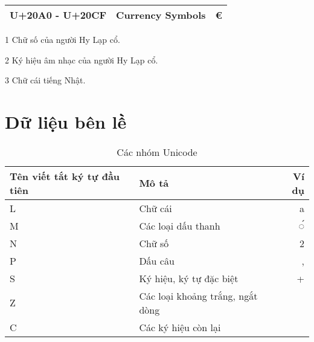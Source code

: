 \begin{table}
\begin{threeparttable}
\begin{tabular}{llr}
            U+20A0 - U+20CF   & Currency Symbols                        & €              \\
            \bottomrule
        \end{tabular}
        \begin{tablenotes}
            \item [1] Chữ số của người Hy Lạp cổ.
            \item [2] Ký hiệu âm nhạc của người Hy Lạp cổ.
            \item [3] Chữ cái tiếng Nhật.
        \end{tablenotes}
    \end{threeparttable}
\end{table}

\section*{Dữ liệu bên lề}
\begin{table}
    \centering
    \caption{Các nhóm Unicode}
    \label{table:unicode-categories}
    \begin{tabular}{llr}
        \toprule
        \textbf{Tên viết tắt ký tự đầu tiên} & \textbf{Mô tả}                   & \textbf{Ví dụ} \\\midrule
        L                                    & Chữ cái                          & a              \\
        M                                    & Các loại dấu thanh               & ◌́              \\
        N                                    & Chữ số                           & 2              \\
        P                                    & Dấu câu                          & ,              \\
        S                                    & Ký hiệu, ký tự đặc biệt          & +              \\
        Z                                    & Các loại khoảng trắng, ngắt dòng &                \\
        C                                    & Các ký hiệu còn lại              &                \\
        \bottomrule
    \end{tabular}
\end{table}
